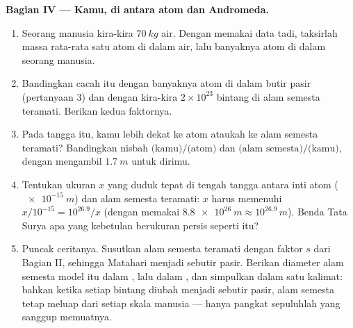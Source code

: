\begin{problem}
\medskip
\noindent\textbf{Bagian IV --- Kamu, di antara atom dan Andromeda.}
\begin{enumerate}[resume]
  \item Seorang manusia kira-kira $\qty{70}{kg}$ air. Dengan memakai
        data tadi, taksirlah massa rata-rata satu atom di dalam air,
        lalu banyaknya atom di dalam seorang manusia.
  \item Bandingkan cacah itu dengan banyaknya atom di dalam butir pasir
        (pertanyaan 3) dan dengan kira-kira $2\times10^{23}$ bintang di
        alam semesta teramati. Berikan kedua faktornya.
  \item Pada tangga itu, kamu lebih dekat ke atom ataukah ke alam
        semesta teramati? Bandingkan nisbah
        $\text{(kamu)}/\text{(atom)}$ dan
        $\text{(alam semesta)}/\text{(kamu)}$, dengan mengambil
        $\qty{1.7}{m}$ untuk dirimu.
  \item Tentukan ukuran $x$ yang duduk tepat di tengah tangga antara
        inti atom ($\qty{e-15}{m}$) dan alam semesta teramati: $x$
        harus memenuhi $x / 10^{-15} = 10^{26.9} / x$ (dengan memakai
        $\qty{8.8e26}{m} \approx 10^{26.9}\,\unit{m}$). Benda Tata
        Surya apa yang kebetulan berukuran persis seperti itu?
  \item Puncak ceritanya. Susutkan alam semesta teramati dengan faktor
        $s$ dari Bagian II, sehingga Matahari menjadi sebutir pasir.
        Berikan diameter alam semesta model itu dalam , lalu dalam
        , dan simpulkan dalam satu kalimat: bahkan
        ketika setiap bintang diubah menjadi sebutir pasir, alam
        semesta tetap meluap dari setiap skala manusia --- hanya
        pangkat sepuluhlah yang sanggup memuatnya.
\end{enumerate}
\end{problem}
